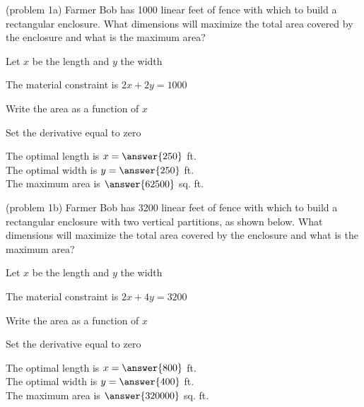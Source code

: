 \documentclass{ximera}
\begin{document}
\begin{center}
\begin{foldable}
\end{foldable}
\end{center}




\begin{problem}(problem 1a)
Farmer Bob has 1000 linear feet of fence with which to build a rectangular enclosure.  What dimensions will maximize the total area covered by the enclosure and what is the maximum area?

\begin{hint}
Let $x$ be the length and $y$ the width
\end{hint}
\begin{hint}
The material constraint is $2x+2y = 1000$
\end{hint}
\begin{hint}
Write the area as a function of $x$
\end{hint}
\begin{hint}
Set the derivative equal to zero
\end{hint}

The optimal length is $x= \answer{250}$ ft.\\
The optimal width is $y = \answer{250}$ ft.\\
The maximum area is $\answer{62500}$ sq. ft.


\end{problem}


\begin{problem}(problem 1b)
Farmer Bob has 3200 linear feet of fence with which to build a rectangular enclosure with two vertical partitions, as shown below.
What dimensions will maximize the total area covered by the enclosure and what is the maximum area?

\begin{center}
\end{center}
\begin{hint}
Let $x$ be the length and $y$ the width
\end{hint}
\begin{hint}
The material constraint is $2x+4y = 3200$
\end{hint}
\begin{hint}
Write the area as a function of $x$
\end{hint}
\begin{hint}
Set the derivative equal to zero
\end{hint}

The optimal length is $x= \answer{800}$ ft.\\
The optimal width is $y = \answer{400}$ ft.\\
The maximum area is $\answer{320000}$ sq. ft.
 
\end{problem}
\end{document}
